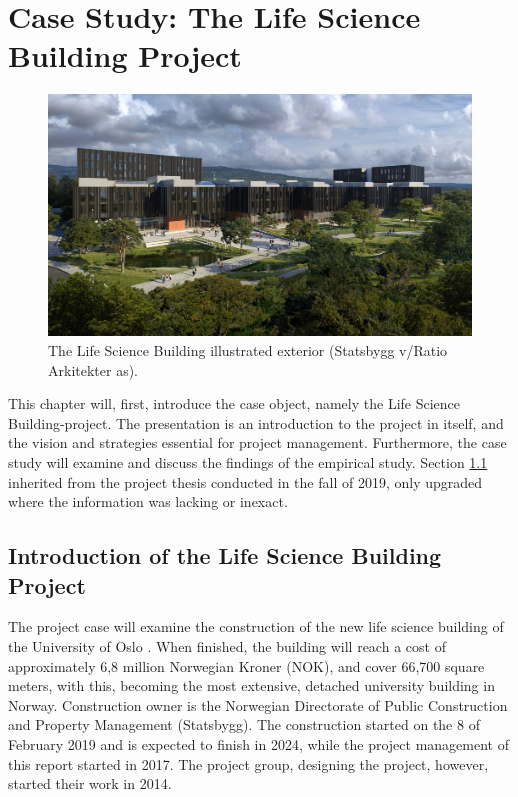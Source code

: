 
\chapter{Case Study: The Life Science Building Project} \label{chp:case}
\begin{figure}[h!]
    \centering
    \includegraphics[width=\textwidth]{fig/bygget.jpg}
    \caption{The Life Science Building illustrated exterior (Statsbygg v/Ratio Arkitekter as).}
    \label{fig:illustration}
\end{figure}
\pagebreak
This chapter will, first, introduce the case object, namely the Life Science Building-project. The presentation is an introduction to the project in itself, and the vision and strategies essential for project management. Furthermore, the case study will examine and discuss the findings of the empirical study. Section \ref{sec:case-intro} inherited from the project thesis conducted in the fall of 2019, only upgraded where the information was lacking or inexact.


\section{Introduction of the Life Science Building Project} \label{sec:case-intro} 
The project case will examine the construction of the new life science building of the University of Oslo \citep{statsbygg2019uio, uio2019science}. When finished, the building will reach a cost of approximately 6,8 million Norwegian Kroner (NOK), and cover 66,700 square meters, with this, becoming the most extensive, detached university building in Norway. Construction owner is the Norwegian Directorate of Public Construction and Property Management (Statsbygg). The construction started on the 8 of February 2019 and is expected to finish in 2024, while the project management of this report started in 2017. The project group, designing the project, however, started their work in 2014.

